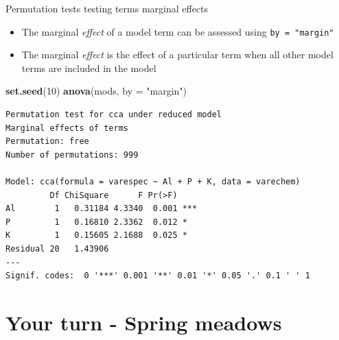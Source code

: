 \documentclass[10pt,ignorenonframetext,compress, aspectratio=169]{beamer}
\newenvironment{Shaded}{\begin{snugshade}}{\end{snugshade}}
\newcommand{\KeywordTok}[1]{\textcolor[rgb]{0.13,0.29,0.53}{\textbf{{#1}}}}
\newcommand{\DataTypeTok}[1]{\textcolor[rgb]{0.13,0.29,0.53}{{#1}}}
\newcommand{\DecValTok}[1]{\textcolor[rgb]{0.00,0.00,0.81}{{#1}}}
\newcommand{\StringTok}[1]{\textcolor[rgb]{0.31,0.60,0.02}{{#1}}}
\newcommand{\NormalTok}[1]{{#1}}
\begin{document}
\begin{frame}[fragile]{Permutation tests \textbar{} testing terms
marginal effects}

\begin{itemize}
\itemsep1pt\parskip0pt
\item
  The marginal \emph{effect} of a model term can be assessed using
  \texttt{by\ =\ "margin"}
\item
  The marginal \emph{effect} is the effect of a particular term when all
  other model terms are included in the model
\end{itemize}

\tiny

\begin{Shaded}
\begin{Highlighting}[]
\KeywordTok{set.seed}\NormalTok{(}\DecValTok{10}\NormalTok{)}
\KeywordTok{anova}\NormalTok{(mods, }\DataTypeTok{by =} \StringTok{"margin"}\NormalTok{)}
\end{Highlighting}
\end{Shaded}

\begin{verbatim}
Permutation test for cca under reduced model
Marginal effects of terms
Permutation: free
Number of permutations: 999

Model: cca(formula = varespec ~ Al + P + K, data = varechem)
         Df ChiSquare      F Pr(>F)    
Al        1   0.31184 4.3340  0.001 ***
P         1   0.16810 2.3362  0.012 *  
K         1   0.15605 2.1688  0.025 *  
Residual 20   1.43906                  
---
Signif. codes:  0 '***' 0.001 '**' 0.01 '*' 0.05 '.' 0.1 ' ' 1
\end{verbatim}

\normalsize

\end{frame}

\section{Your turn - Spring meadows}\label{your-turn---spring-meadows}
\end{document}
